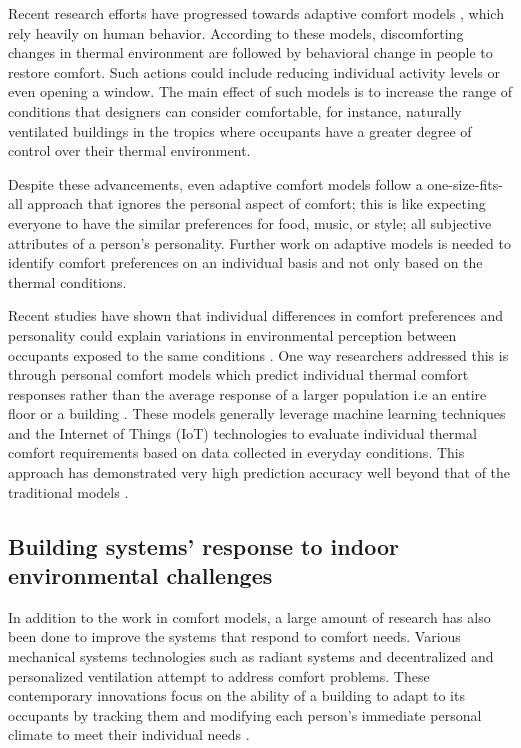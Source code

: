 \documentclass[]{interact}
\theoremstyle{plain}%
\theoremstyle{definition}
\theoremstyle{remark}
\begin{document}
Recent research efforts have progressed towards adaptive comfort models \citep{Ferrari2012AdaptiveIndices, Nicol2013AdaptiveWorld, vanHoof2010ThermalPractice}, which rely heavily on human behavior. According to these models, discomforting changes in thermal environment are followed by behavioral change in people to restore comfort. Such actions could include reducing individual activity levels or even opening a window. The main effect of such models is to increase the range of conditions that designers can consider comfortable, for instance, naturally ventilated buildings in the tropics where occupants have a greater degree of control over their thermal environment.

Despite these advancements, even adaptive comfort models follow a one-size-fits-all approach that ignores the personal aspect of comfort; this is like expecting everyone to have the similar preferences for food, music, or style; all subjective attributes of a person’s personality. Further work on adaptive models is needed to identify comfort preferences on an individual basis and not only based on the thermal conditions.  

Recent studies have shown that individual differences in comfort preferences and personality could explain variations in environmental perception between occupants exposed to the same conditions \cite{cheung2019analysis, livcina2018development}. One way researchers addressed this is through personal comfort models which predict individual thermal comfort responses rather than the average response of a larger population i.e an entire floor or a building \cite{kim2018personal}. These models generally leverage  machine learning techniques and the Internet of Things (IoT) technologies to evaluate individual thermal comfort requirements based on data collected in everyday conditions. This approach has demonstrated very high prediction accuracy well beyond that of the traditional models \cite{kim2018personal1}.





\subsection{Building systems’ response to indoor environmental challenges}
In addition to the work in comfort models, a large amount of research has also been done to improve the systems that respond to comfort needs. Various mechanical systems technologies such as radiant systems and decentralized and personalized ventilation attempt to address comfort problems. These contemporary innovations focus on the ability of a building to adapt to its occupants by tracking them and modifying each person's immediate personal climate to meet their individual needs \citep{Brager2015EvolvingComfort}. 
\end{document}
